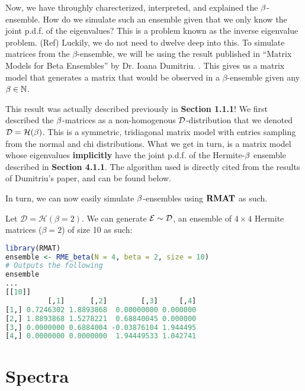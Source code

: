 Now, we have throughly charecterized, interpreted, and explained the $\beta$-ensemble. How do we simulate such an ensemble given that we only know the joint p.d.f. of the eigenvalues?
This is a problem known as the inverse eigenvalue problem. (Ref) Luckily, we do not need to dwelve deep into this. To simulate matrices from the $\beta$-ensemble, we will be using the result published in ``Matrix Models for Beta Ensembles'' by Dr. Ioana Dumitriu. \cite{dumitriu}. This gives us a matrix model that generates a matrix that would be observed in a $\beta$-ensemble given any $\beta \in \mathbb{N}$.


This result was actually described previously in \textbf{Section 1.1.1}! We first described the $\beta$-matrices as a non-homogenous $\mathcal{D}$-distribution that we denoted $\mathcal{D} = \mathcal{H}(\beta)$. This is a symmetric, tridiagonal matrix model with entries sampling from the normal and chi distributions. What we get in turn, is a matrix model whose eigenvalues \textbf{implicitly} have the joint p.d.f. of the Hermite-$\beta$ ensemble described in \textbf{Section 4.1.1}. The algorithm used is directly cited from the results of Dumitriu's paper, and can be found below.

\ALGbeta

In turn, we can now easily simulate $\beta$-ensembles using ${\textbf{RMAT}}$ as such.

\begin{code}[Hermite Beta = 2 Ensemble]
Let $\mathcal{D} = \mathcal{H}(\beta = 2)$. We can generate $\mathcal{E} \sim \mathcal{D}$, an ensemble of $4 \times 4$ Hermite matrices ($\beta = 2$) of size 10 as such:
\end{code}

\begin{lstlisting}[language=R]
library(RMAT)
ensemble <- RME_beta(N = 4, beta = 2, size = 10)
# Outputs the following
ensemble
...
[[10]]
          [,1]      [,2]        [,3]     [,4]
[1,] 0.7246302 1.8893868  0.00000000 0.000000
[2,] 1.8893868 1.5278221  0.68840045 0.000000
[3,] 0.0000000 0.6884004 -0.03876104 1.944495
[4,] 0.0000000 0.0000000  1.94449533 1.042741
\end{lstlisting}

\newpage
\section{Spectra}


